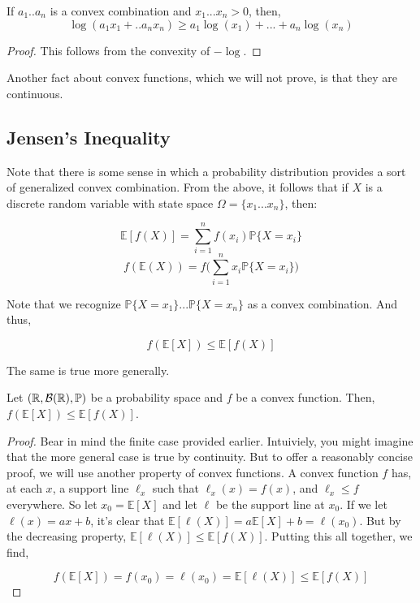     \begin{corollary}\label{cor:cool_log_property}
        If $a_1..a_n$ is a convex combination and $x_1...x_n > 0$, then, 
        \[ \log(a_1x_1 + .. a_nx_n) \geq a_1\log(x_1) + ... + a_n\log(x_n) \]
    \end{corollary}
    \begin{proof}
        This follows from the convexity of $-\log$.
    \end{proof}

    Another fact about convex functions, which we will not prove, is that they are continuous.

    \subsection{Jensen's Inequality}

    Note that there is some sense in which a probability distribution provides a sort of 
    generalized convex combination. From the above, it follows that if $X$ is a discrete random variable with 
    state space $\Omega = \{x_1...x_n\}$, then: 

    \[ \mathbb E[f(X)] = \sum_{i=1}^n f(x_i) \mathbb P\{X = x_i\} \]
    \[ f(\mathbb E(X)) = f\bigg(\sum_{i=1}^n x_i \mathbb P\{X = x_i\} \bigg) \]

    Note that we recognize $\mathbb P\{X = x_1\}... \mathbb P\{X=x_n\}$ as a convex combination. 
    And thus, 

    \[ f(\mathbb E[X]) \leq \mathbb E[f(X)]  \]

    The same is true more generally. 


    \begin{theorem}
        Let $(\mathbb R, \mathcal B(\mathbb R), \mathbb P)$ be a probability space and 
        $f$ be a convex function. Then, $f(\mathbb E[X]) \leq \mathbb E[f(X)]$. 
    \end{theorem}

    \begin{proof}
        
        Bear in mind the finite case provided earlier. Intuiviely, you might imagine that 
        the more general case is true by continuity. But to offer a reasonably concise proof, 
        we will use another property of convex functions. A convex function $f$ has, at each $x$, 
        a support line $\ell_x$ such that $\ell_x(x) = f(x)$, and $\ell_x \leq f$ everywhere. 
        So let $x_0 = \mathbb E[X]$ and let $\ell$ be the support line at $x_0$. If we let 
        $\ell(x) = ax + b$, it's clear that $\mathbb E[\ell(X)] = a \mathbb E[X] + b = \ell(x_0)$. 
        But by the decreasing property, $\mathbb E[\ell(X)] \leq \mathbb E[f(X)]$. Putting this all 
        together, we find,

        \[ f(\mathbb E[X]) = f(x_0) = \ell(x_0) = \mathbb E[\ell(X)] \leq \mathbb E[f(X)] \]

    \end{proof}

